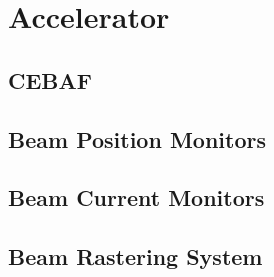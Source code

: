 \section{Accelerator}
\lipsum[1-2]

\subsection{CEBAF}
\lipsum[1-2]

\subsection{Beam Position Monitors}
\lipsum[1-2]

\subsection{Beam Current Monitors}
\lipsum[1-2]

\subsection{Beam Rastering System}
\lipsum[1-2]
